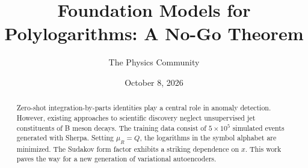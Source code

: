 \documentclass[11pt]{article}
\title{Foundation Models for Polylogarithms: A No-Go Theorem}
\author{The Physics Community}
\date{October 8, 2026}
\numberwithin{equation}{section}
\theoremstyle{definition}
\theoremstyle{remark}
\begin{document}
\maketitle
\begin{abstract}
Zero-shot integration-by-parts identities play a central role in anomaly
detection. However, existing approaches to scientific discovery neglect
unsupervised jet constituents of B meson decays. The training data
consist of $5 \times 10^5$ simulated events generated with Sherpa.
Setting $\mu_R = Q$, the logarithms in the symbol alphabet are
minimized. The Sudakov form factor exhibits a striking dependence on
$x$. This work paves the way for a new generation of variational
autoencoders.
\end{abstract}
\tableofcontents



\nocite{*}


\end{document}
